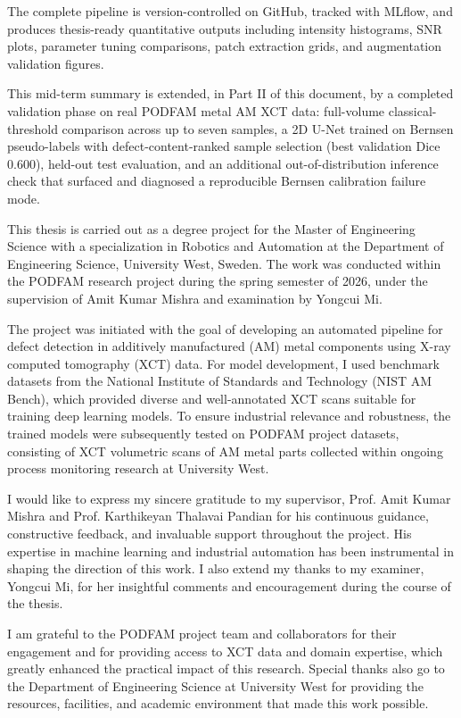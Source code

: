 The complete pipeline is version-controlled on GitHub, tracked with MLflow, and produces thesis-ready
quantitative outputs including intensity histograms, SNR plots, parameter tuning comparisons, patch
extraction grids, and augmentation validation figures.

This mid-term summary is extended, in Part II of this document, by a completed validation phase on
real PODFAM metal AM XCT data: full-volume classical-threshold comparison across up to seven samples,
a 2D U-Net trained on Bernsen pseudo-labels with defect-content-ranked sample selection (best
validation Dice 0.600), held-out test evaluation, and an additional out-of-distribution inference
check that surfaced and diagnosed a reproducible Bernsen calibration failure mode.

\clearpage
{}
This thesis is carried out as a degree project for the Master of Engineering Science with a
specialization in Robotics and Automation at the Department of Engineering Science, University West,
Sweden. The work was conducted within the PODFAM research project during the spring semester of
2026, under the supervision of Amit Kumar Mishra and examination by Yongcui Mi.

The project was initiated with the goal of developing an automated pipeline for defect detection in
additively manufactured (AM) metal components using X-ray computed tomography (XCT) data. For model
development, I used benchmark datasets from the National Institute of Standards and Technology (NIST
AM Bench), which provided diverse and well-annotated XCT scans suitable for training deep learning
models. To ensure industrial relevance and robustness, the trained models were subsequently tested on
PODFAM project datasets, consisting of XCT volumetric scans of AM metal parts collected within
ongoing process monitoring research at University West.

I would like to express my sincere gratitude to my supervisor, Prof. Amit Kumar Mishra and Prof.
Karthikeyan Thalavai Pandian for his continuous guidance, constructive feedback, and invaluable
support throughout the project. His expertise in machine learning and industrial automation has been
instrumental in shaping the direction of this work. I also extend my thanks to my examiner, Yongcui
Mi, for her insightful comments and encouragement during the course of the thesis.

I am grateful to the PODFAM project team and collaborators for their engagement and for providing
access to XCT data and domain expertise, which greatly enhanced the practical impact of this
research. Special thanks also go to the Department of Engineering Science at University West for
providing the resources, facilities, and academic environment that made this work possible.

